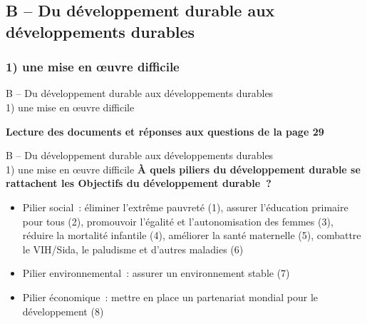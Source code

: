 \documentclass[C]{beamer}
\begin{document}
	\subsection*{B -- Du développement durable aux développements durables}
	\subsubsection*{1) une mise en œuvre difficile}
	\begin{frame}{B -- Du développement durable aux développements durables\\ 1) une mise en œuvre difficile}
	\begin{center}
	\textbf{Lecture des documents et réponses aux questions de la page 29}
	\end{center}
	\end{frame}
	
	\begin{frame}{B -- Du développement durable aux développements durables\\ 1) une mise en œuvre difficile}
	\textbf{\`A quels piliers du développement durable se rattachent les Objectifs du développement durable~?}
	\begin{itemize}
	\item Pilier social~: éliminer l'extrême pauvreté (1), assurer l'éducation primaire pour tous (2), promouvoir l'égalité et l'autonomisation des femmes (3), réduire la mortalité infantile (4), améliorer la santé maternelle (5), combattre le VIH/Sida, le paludisme et d'autres maladies (6)\\
\pause
	\item Pilier environnemental~: assurer un environnement stable (7)\\
\pause
	\item Pilier économique~: mettre en place un partenariat mondial pour le développement (8)
	\end{itemize}
	\end{frame}
	
\end{document}
